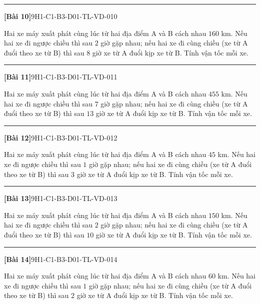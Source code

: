 \documentclass[12pt,a4paper]{article}
\newif\ifloigiai
\newenvironment{cauhoi}[2]{%
  \par\medskip\noindent\rule{\textwidth}{0.4pt}\par\nopagebreak
  \noindent\textbf{[#1]}\hfill{\scriptsize\ttfamily #2}\par\nopagebreak\smallskip}{\par}
\newcommand{\loigiai}[1]{\ifloigiai\par\smallskip\noindent\textit{Lời giải.} #1\par\fi}
\begin{document}
\begin{cauhoi}{Bài 10}{9H1-C1-B3-D01-TL-VD-010}
Hai xe máy xuất phát cùng lúc từ hai địa điểm A và B cách nhau $160$ km. Nếu hai xe đi ngược chiều thì sau $2$ giờ gặp nhau; nếu hai xe đi cùng chiều (xe từ A đuổi theo xe từ B) thì sau $8$ giờ xe từ A đuổi kịp xe từ B. Tính vận tốc mỗi xe.
\loigiai{Gọi vận tốc xe từ A là $x$ (km/h) và xe từ B là $y$ (km/h), $x>y>0$. Đi ngược chiều: $2(x+y)=160$, tức là $x+y=80$. Đi cùng chiều: $8(x-y)=160$, tức là $x-y=20$. Giải hệ ta được $x=50$, $y=30$ (thoả mãn). Vậy vận tốc xe từ A là 50 km/h, xe từ B là 30 km/h.}
\end{cauhoi}
\begin{cauhoi}{Bài 11}{9H1-C1-B3-D01-TL-VD-011}
Hai xe máy xuất phát cùng lúc từ hai địa điểm A và B cách nhau $455$ km. Nếu hai xe đi ngược chiều thì sau $7$ giờ gặp nhau; nếu hai xe đi cùng chiều (xe từ A đuổi theo xe từ B) thì sau $13$ giờ xe từ A đuổi kịp xe từ B. Tính vận tốc mỗi xe.
\loigiai{Gọi vận tốc xe từ A là $x$ (km/h) và xe từ B là $y$ (km/h), $x>y>0$. Đi ngược chiều: $7(x+y)=455$, tức là $x+y=65$. Đi cùng chiều: $13(x-y)=455$, tức là $x-y=35$. Giải hệ ta được $x=50$, $y=15$ (thoả mãn). Vậy vận tốc xe từ A là 50 km/h, xe từ B là 15 km/h.}
\end{cauhoi}
\begin{cauhoi}{Bài 12}{9H1-C1-B3-D01-TL-VD-012}
Hai xe máy xuất phát cùng lúc từ hai địa điểm A và B cách nhau $45$ km. Nếu hai xe đi ngược chiều thì sau $1$ giờ gặp nhau; nếu hai xe đi cùng chiều (xe từ A đuổi theo xe từ B) thì sau $3$ giờ xe từ A đuổi kịp xe từ B. Tính vận tốc mỗi xe.
\loigiai{Gọi vận tốc xe từ A là $x$ (km/h) và xe từ B là $y$ (km/h), $x>y>0$. Đi ngược chiều: $(x+y)=45$, tức là $x+y=45$. Đi cùng chiều: $3(x-y)=45$, tức là $x-y=15$. Giải hệ ta được $x=30$, $y=15$ (thoả mãn). Vậy vận tốc xe từ A là 30 km/h, xe từ B là 15 km/h.}
\end{cauhoi}
\begin{cauhoi}{Bài 13}{9H1-C1-B3-D01-TL-VD-013}
Hai xe máy xuất phát cùng lúc từ hai địa điểm A và B cách nhau $150$ km. Nếu hai xe đi ngược chiều thì sau $2$ giờ gặp nhau; nếu hai xe đi cùng chiều (xe từ A đuổi theo xe từ B) thì sau $10$ giờ xe từ A đuổi kịp xe từ B. Tính vận tốc mỗi xe.
\loigiai{Gọi vận tốc xe từ A là $x$ (km/h) và xe từ B là $y$ (km/h), $x>y>0$. Đi ngược chiều: $2(x+y)=150$, tức là $x+y=75$. Đi cùng chiều: $10(x-y)=150$, tức là $x-y=15$. Giải hệ ta được $x=45$, $y=30$ (thoả mãn). Vậy vận tốc xe từ A là 45 km/h, xe từ B là 30 km/h.}
\end{cauhoi}
\begin{cauhoi}{Bài 14}{9H1-C1-B3-D01-TL-VD-014}
Hai xe máy xuất phát cùng lúc từ hai địa điểm A và B cách nhau $60$ km. Nếu hai xe đi ngược chiều thì sau $1$ giờ gặp nhau; nếu hai xe đi cùng chiều (xe từ A đuổi theo xe từ B) thì sau $2$ giờ xe từ A đuổi kịp xe từ B. Tính vận tốc mỗi xe.
\loigiai{Gọi vận tốc xe từ A là $x$ (km/h) và xe từ B là $y$ (km/h), $x>y>0$. Đi ngược chiều: $(x+y)=60$, tức là $x+y=60$. Đi cùng chiều: $2(x-y)=60$, tức là $x-y=30$. Giải hệ ta được $x=45$, $y=15$ (thoả mãn). Vậy vận tốc xe từ A là 45 km/h, xe từ B là 15 km/h.}
\end{cauhoi}
\end{document}
